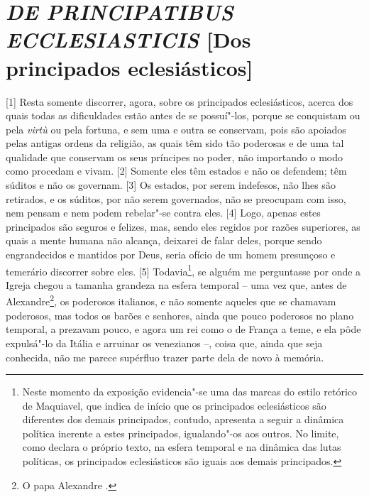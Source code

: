 \quebra\section{\emph{DE PRINCIPATIBUS ECCLESIASTICIS}\break
{[}Dos principados eclesiásticos{]}}

{[}1{]} Resta somente discorrer, agora, sobre os principados
eclesiásticos, acerca dos quais todas as dificuldades estão antes de se
possuí"-los, porque se conquistam ou pela \emph{virtù} ou pela fortuna, e
sem uma e outra se conservam, pois são apoiados pelas antigas ordens da
religião, as quais têm sido tão poderosas e de uma tal qualidade que
conservam os seus príncipes no poder, não importando o modo como
procedam e vivam. {[}2{]} Somente eles têm estados e não os defendem;
têm súditos e não os governam. {[}3{]} Os estados, por serem indefesos,
não lhes são retirados, e os súditos, por não serem governados, não se
preocupam com isso, nem pensam e nem podem rebelar"-se contra eles.
{[}4{]} Logo, apenas estes principados são seguros e felizes, mas, sendo
eles regidos por razões superiores, as quais a mente humana não alcança,
deixarei de falar deles, porque sendo engrandecidos e mantidos por Deus,
seria ofício de um homem presunçoso e temerário discorrer sobre eles.
{[}5{]} Todavia\footnote{Neste momento da exposição evidencia"-se uma das
  marcas do estilo retórico de Maquiavel, que indica de início que os
  principados eclesiásticos são diferentes dos demais principados,
  contudo, apresenta a seguir a dinâmica política inerente a estes
  principados, igualando"-os aos outros. No limite, como declara o
  próprio texto, na esfera temporal e na dinâmica das lutas políticas,
  os principados eclesiásticos são iguais aos demais principados.}, se
alguém me perguntasse por onde a Igreja chegou a tamanha grandeza na
esfera temporal -- uma vez que, antes de Alexandre\footnote{O papa
  Alexandre .}, os poderosos italianos, e não somente aqueles que se
chamavam poderosos, mas todos os barões e senhores, ainda que pouco
poderosos no plano temporal, a prezavam pouco, e agora um rei como o de
França a teme, e ela pôde expulsá"-lo da Itália e arruinar os venezianos
--, coisa que, ainda que seja conhecida, não me parece supérfluo trazer
parte dela de novo à memória.


